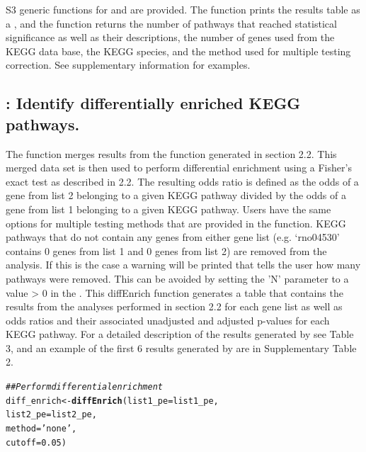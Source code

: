 \documentclass[article]{jss}\usepackage[]{graphicx}\usepackage[]{color}
\makeatletter
\newcommand{\hlnum}[1]{\textcolor[rgb]{0.686,0.059,0.569}{#1}}%
\newcommand{\hlstr}[1]{\textcolor[rgb]{0.192,0.494,0.8}{#1}}%
\newcommand{\hlcom}[1]{\textcolor[rgb]{0.678,0.584,0.686}{\textit{#1}}}%
\newcommand{\hlstd}[1]{\textcolor[rgb]{0.345,0.345,0.345}{#1}}%
\newcommand{\hlkwb}[1]{\textcolor[rgb]{0.69,0.353,0.396}{#1}}%
\newcommand{\hlkwc}[1]{\textcolor[rgb]{0.333,0.667,0.333}{#1}}%
\newcommand{\hlkwd}[1]{\textcolor[rgb]{0.737,0.353,0.396}{\textbf{#1}}}%
\newenvironment{kframe}{%
 \def\at@end@of@kframe{}%
 \ifinner\ifhmode%
  \def\at@end@of@kframe{\end{minipage}}%
  \begin{minipage}{\columnwidth}%
 \fi\fi%
 \def\FrameCommand##1{\hskip\@totalleftmargin \hskip-\fboxsep
 \colorbox{shadecolor}{##1}\hskip-\fboxsep
     \hskip-\linewidth \hskip-\@totalleftmargin \hskip\columnwidth}%
 \MakeFramed {\advance\hsize-\width
   \@totalleftmargin\z@ \linewidth\hsize
   \@setminipage}}%
 {\par\unskip\endMakeFramed%
 \at@end@of@kframe}
\newenvironment{knitrout}{}{} %
\makeatother
\begin{document}
S3 generic functions for  and  are provided.
The  function prints the results table as a , and the
 function returns the number of pathways that reached statistical
significance as well as their descriptions, the number of genes used from the
KEGG data base, the KEGG species, and the method used for multiple testing
correction. See supplementary information for examples.

\subsection{: Identify differentially enriched KEGG pathways.}

The  function merges results from the  function
generated in section 2.2. This merged data set is then used to perform differential
enrichment using a Fisher’s exact test as described in 2.2. The resulting odds
ratio is defined as the odds of a gene from list 2 belonging to a given KEGG
pathway divided by the odds of a gene from list 1 belonging to a given KEGG
pathway. Users have the same options for multiple testing methods that are
provided in the  function. KEGG pathways that do not contain
any genes from either gene list (e.g. ‘rno04530’ contains 0 genes from list 1
and 0 genes from list 2) are removed from the analysis. If this is the case a
warning will be printed that tells the user how many pathways were removed.
This can be avoided by setting the 'N' parameter to a value > 0 in the
. This diffEnrich function generates a table that
contains the results from the analyses performed in section 2.2 for each gene
list as well as odds ratios and their associated unadjusted and adjusted
p-values for each KEGG pathway. For a detailed description of the results
generated by  see Table 3, and an example of the first 6
results generated by  are in Supplementary Table 2.

\begin{knitrout}
\color{fgcolor}\begin{kframe}
\begin{alltt}
\hlcom{## Perform differential enrichment}
\hlstd{diff_enrich} \hlkwb{<-} \hlkwd{diffEnrich}\hlstd{(}\hlkwc{list1_pe} \hlstd{= list1_pe,}
                          \hlkwc{list2_pe} \hlstd{= list2_pe,}
                          \hlkwc{method} \hlstd{=} \hlstr{'none'}\hlstd{,}
                          \hlkwc{cutoff} \hlstd{=} \hlnum{0.05}\hlstd{)}
\end{alltt}
\end{kframe}
\end{knitrout}
\end{document}
